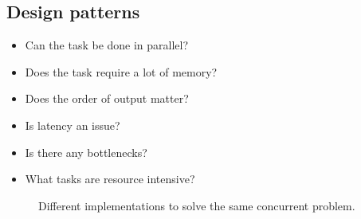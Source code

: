 \subsection{Design patterns}
\todo
\begin{itemize}
    \item Can the task be done in parallel?
    \item Does the task require a lot of memory?
    \item Does the order of output matter?
    \item Is latency an issue?
    \item Is there any bottlenecks?
    \item What tasks are resource intensive?
\end{itemize}
\begin{figure}[H]
    \centering
    \caption{Different implementations to solve the same concurrent problem.}
    \label{fig:concurrency_concurrent_overlap}
\end{figure}

